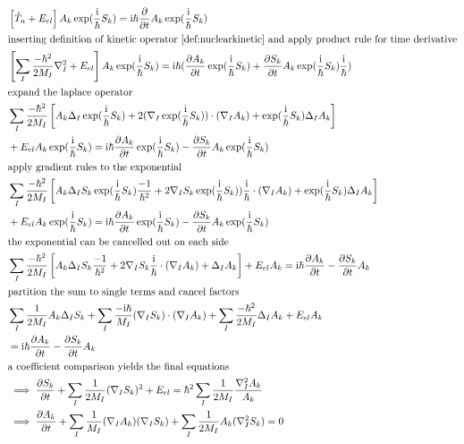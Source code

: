 \documentclass[12pt]{scrartcl}
\begin{document}
\begin{align*}
&\left[ \hat{T}_n+E_{el}\right]A_k\exp(\frac{\mathrm{i}}{\hbar}S_k)=\mathrm{i}\hbar\frac{\partial }{\partial t}A_k\exp(\frac{\mathrm{i}}{\hbar}S_k)\\
\intertext{inserting definition of kinetic operator \ref{def:nuclearkinetic} and apply product rule for time derivative}
&\left[ \sum_I\frac{-\hbar^2}{2M_I}\nabla_I^2+E_{el}\right]A_k\exp(\frac{\mathrm{i}}{\hbar}S_k)=\mathrm{i}\hbar(\frac{\partial A_k}{\partial t}\exp(\frac{\mathrm{i}}{\hbar}S_k)+\frac{\partial S_k}{\partial t}A_k\exp(\frac{\mathrm{i}}{\hbar}S_k)\frac{\mathrm{i}}{\hbar})\\
\intertext{expand the laplace operator}
&\sum_I\frac{-\hbar^2}{2M_I}\left[ A_k\Delta_I\exp(\frac{\mathrm{i}}{\hbar}S_k)+2(\nabla_I\exp(\frac{\mathrm{i}}{\hbar}S_k))\cdot(\nabla_IA_k)+\exp(\frac{\mathrm{i}}{\hbar}S_k)\Delta_IA_k\right]\\
&+E_{el}A_k\exp(\frac{\mathrm{i}}{\hbar}S_k)=\mathrm{i}\hbar\frac{\partial A_k}{\partial t}\exp(\frac{\mathrm{i}}{\hbar}S_k)-\frac{\partial S_k}{\partial t}A_k\exp(\frac{\mathrm{i}}{\hbar}S_k)\\
\intertext{apply gradient rules to the exponential}
&\sum_I\frac{-\hbar^2}{2M_I}\left[ A_k\Delta_IS_k\exp(\frac{\mathrm{i}}{\hbar}S_k)\frac{-1}{\hbar^2}+2\nabla_IS_k\exp(\frac{\mathrm{i}}{\hbar}S_k))\frac{\mathrm{i}}{\hbar}\cdot(\nabla_IA_k)+\exp(\frac{\mathrm{i}}{\hbar}S_k)\Delta_IA_k\right]\\
&+E_{el}A_k\exp(\frac{\mathrm{i}}{\hbar}S_k)=\mathrm{i}\hbar\frac{\partial A_k}{\partial t}\exp(\frac{\mathrm{i}}{\hbar}S_k)-\frac{\partial S_k}{\partial t}A_k\exp(\frac{\mathrm{i}}{\hbar}S_k)\\
\intertext{the exponential can be cancelled out on each side}
&\sum_I\frac{-\hbar^2}{2M_I}\left[ A_k\Delta_IS_k\frac{-1}{\hbar^2}+2\nabla_IS_k\frac{\mathrm{i}}{\hbar}\cdot(\nabla_IA_k)+\Delta_IA_k\right]+E_{el}A_k=\mathrm{i}\hbar\frac{\partial A_k}{\partial t}-\frac{\partial S_k}{\partial t}A_k\\
\intertext{partition the sum to single terms and cancel factors}
&\sum_I\frac{1}{2M_I}A_k\Delta_IS_k+\sum_I\frac{-\mathrm{i}\hbar}{M_I}(\nabla_IS_k)\cdot(\nabla_IA_k)+\sum_I\frac{-\hbar^2}{2M_I}\Delta_IA_k+E_{el}A_k\\
&=\mathrm{i}\hbar\frac{\partial A_k}{\partial t}-\frac{\partial S_k}{\partial t}A_k\\
\intertext{a coefficient comparison yields the final equations}
&\implies\frac{\partial S_k}{\partial t} + \sum_I\frac{1}{2M_I}(\nabla_IS_k)^2+E_{el}=\hbar^2\sum_I\frac{1}{2M_I}\frac{\nabla_I^2A_k}{A_k} \\
&\implies\frac{\partial A_k}{\partial t}+\sum_I\frac{1}{M_I}(\nabla_IA_k)(\nabla_IS_k)+\sum_I\frac{1}{2M_I}A_k(\nabla_I^2S_k)=0
\end{align*}
\end{document}
